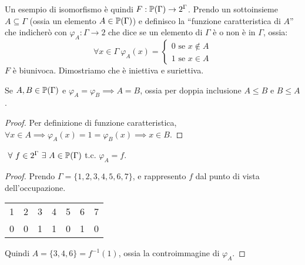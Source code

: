 Un esempio di isomorfismo \`e quindi $F : \mathbb{P}(\Gamma) \to 2^{\Gamma}$. Prendo un sottoinsieme $A \subseteq \Gamma$ (ossia un elemento $A \in \mathbb{P}(\Gamma)$) e definisco la ``funzione caratteristica di $A$'' che indicher\`o con $\varphi_{A} : \Gamma \to 2$ che dice se un elemento di $\Gamma$ \`e o non \`e in $\Gamma$, ossia:
\[
\forall x \in \Gamma \ \varphi_A (x) = 
\begin{cases}
0 \text{ se } x \notin A \\
1 \text{ se } x \in A
\end{cases}
\]
$F$ \`e biunivoca. Dimostriamo che \`e iniettiva e suriettiva.
\begin{prop}
Se $A, B \in \mathbb{P}(\Gamma)$ e $\varphi_A = \varphi_B \implies A = B$, ossia per doppia inclusione $A \le B$ e $B \le A$.
\end{prop}
\begin{proof}
Per definizione di funzione caratteristica, $\forall x \in A \implies \varphi_A(x) = 1 = \varphi_B(x) \implies x \in B$.
\end{proof}
\begin{prop}
$\forall f \in 2^{\Gamma} \exists A \in \parts(\Gamma)$ t.c. $\varphi_A = f$.
\end{prop}
\begin{proof}
Prendo $\Gamma = \{ 1, 2, 3, 4, 5, 6, 7\}$, e rappresento $f$ dal punto di vista dell'occupazione.

\begin{tabular}{*{7}{c}}
1 & 2 & 3 & 4 & 5 & 6 & 7 \\
0 & 0 & 1 & 1 & 0 & 1 & 0
\end{tabular}

Quindi $A = \{ 3, 4, 6 \} = f^{-1} (1)$, ossia la controimmagine di $\varphi_A$.
\end{proof}

